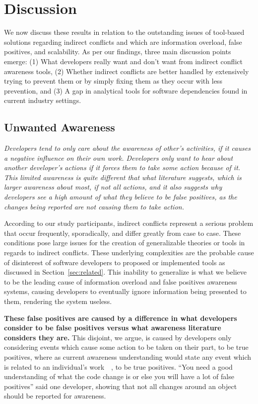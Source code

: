 \documentclass[conference]{IEEEtran}
\begin{document}
\section{Discussion}
\label{sec:disc}

We now discuss these results in relation to the outstanding issues of tool-based solutions regarding indirect conflicts and which are information overload,
false positives, and scalability.
As per our findings, three main discussion points emerge: (1) What developers really want and don't want from indirect
conflict awareness tools, (2) Whether indirect conflicts are better handled by extensively trying to prevent them or by simply
fixing them as they occur with less prevention, and (3) A gap in analytical tools for software dependencies found in current
industry settings.

\subsection{Unwanted Awareness}

\textit{Developers tend to only care about the awareness of other's activities, if it causes
a negative influence on their own work. Developers only want to hear about another developer's actions if it forces them
to take some action because of it. This limited awareness is quite different that what literature suggests, which is larger
awareness about most, if not all actions, and it also suggests why developers see a high amount of what they believe to be
false positives, as the changes being reported are not causing them to take action.}

According to our study participants, indirect conflicts represent a serious problem that occur frequently,
sporadically, and differ greatly from case to case. These conditions pose large issues for the creation of generalizable theories
or tools in regards to indirect conflicts. These underlying complexities are the probable cause of disinterest of software developers
to proposed or implemented tools as discussed in Section~\ref{sec:related}. This inability to generalize is what we believe to be the
leading cause of information overload and false positives  awareness systems, causing developers to eventually ignore
information being presented to them, rendering the system useless.

\textbf{These false positives are caused by a difference in what
developers consider to be false positives versus what awareness literature considers they are.} This disjoint, we argue, is caused by developers only considering events which cause some action to be taken on their part, to be true positives,
where as current awareness understanding would state any event which is related to an individual's
work~\cite{Herbsleb06collaborationin}~\cite{Cataldo:2008:SCF}, to be true positives.
``You need a good understanding of what the code change is or else you will have a lot of false positives'' said one developer,
showing that not all changes around an object should be reported for awareness.
\end{document}

